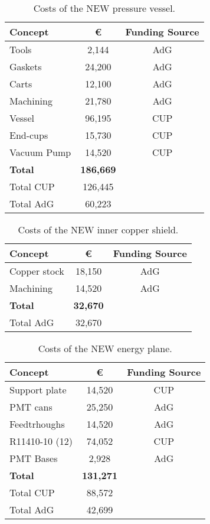 \begin{table}[h!]
\begin{center}
\begin{tabular}{|l|c|c|}
\hline
 Concept & \euro & Funding Source \\
 \hline
 Tools &	2,144 &	AdG \\
Gaskets & 24,200 &	AdG \\
Carts	& 12,100 &	AdG\\
Machining	 & 21,780 & 	AdG\\
Vessel	& 96,195 &	CUP \\
End-cups	& 15,730 &	CUP \\
Vacuum Pump	& 14,520 & CUP \\
 \hline
{\bf Total}	& {\bf186,669 }& \\	
Total CUP	& 126,445 & \\	
Total AdG	& 60,223 & \\	
 \hline\hline
\end{tabular}  
\caption{Costs of the NEW pressure vessel.}
\label{tab.new:PV}
\end{center}
\end{table} 

\begin{table}[h!]
\begin{center}
\begin{tabular}{|l|c|c|}
\hline
 Concept & \euro & Funding Source \\
 \hline
 Copper stock &	18,150 &	AdG \\
Machining & 14,520 &	AdG \\
 \hline
{\bf Total} &	{\bf 32,670} & \\		
Total AdG	& 32,670 & \\	
 \hline\hline
\end{tabular}  
\caption{Costs of the NEW inner copper shield.}
\label{tab.new:ICS}
\end{center}
\end{table} 

\begin{table}[h!]
\begin{center}
\begin{tabular}{|l|c|c|}
\hline
 Concept & \euro & Funding Source \\
 \hline
Support plate	&	14,520 &	CUP \\
PMT cans &	25,250 &	AdG\\
Feedtrhoughs &	14,520 &	AdG \\
R11410-10 (12) &	74,052 &	CUP \\
PMT Bases &		 2,928 &	AdG\\
  \hline
{\bf Total}	&	{\bf 131,271}	& \\
Total CUP	&	88,572	&\\
Total AdG	&	42,699 & \\	
 \hline\hline
\end{tabular}  
\caption{Costs of the NEW energy plane.}
\label{tab.new:EP}
\end{center}
\end{table}

